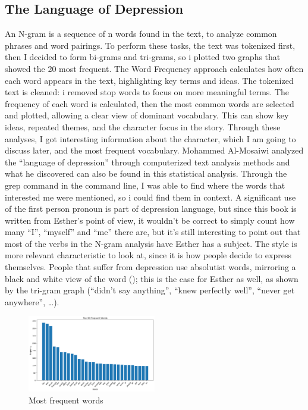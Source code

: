 \documentclass[11pt]{article}
\begin{document}
\subsection{The Language of Depression}
An N-gram is a sequence of n words found in the text, to analyze common phrases and word pairings. To perform these tasks, the text was tokenized first, then I decided to form bi-grams and tri-grams, so i plotted two graphs that showed the 20 most frequent.
The Word Frequency approach calculates how often each word appears in the text, highlighting key terms and ideas. The tokenized text is cleaned: i removed stop words to focus on more meaningful terms. The frequency of each word is calculated, then the most common words are selected and plotted, allowing a clear view of dominant vocabulary. This can show key ideas, repeated themes, and the character focus in the story.
Through these analyses, I got interesting information about the character, which I am going to discuss later, and the most frequent vocabulary.
Mohammed Al-Mosaiwi analyzed the “language of depression” through computerized text analysis methods and what he discovered can also be found in this statistical analysis. 
Through the grep command in the command line, I was able to find where the words that interested me were mentioned, so i could find them in context. A significant use of the first person pronoun is part of depression language, but since this book is written from Esther’s point of view, it wouldn’t be correct to simply count how many “I”, “myself” and “me” there are, but it’s still interesting to point out that most of the verbs in the N-gram analysis have Esther has a subject.  The style is more relevant characteristic to look at, since it is how people decide to express themselves. People that suffer from depression use absolutist words, mirroring a black and white view of the word (); this is the case for Esther as well, as shown by the tri-gram graph (“didn’t say anything”, “knew perfectly well”, “never get anywhere”, …).

\begin{figure}[h]
    \centering
    \includegraphics[width=0.5\textwidth]{graph/freqlist.png}
    \caption{Most frequent words}
    \label{fig:example}
\end{figure}
\end{document}
